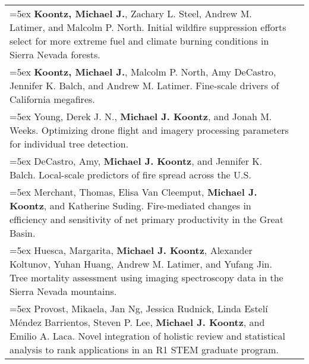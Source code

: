 \begin{longtable}{@{} >{\raggedright}p{5.25in} >{\raggedleft}X @{}}

\hangindent=5ex \textbf{Koontz, Michael J.}, Zachary L. Steel, Andrew M. Latimer, and Malcolm P. North. Initial wildfire suppression efforts select for more extreme fuel and climate burning conditions in Sierra Nevada forests.  & [\textcolor{blue}{\href{https://github.com/mikoontz/selection-by-suppression}{GitHub}}] \tabularnewline

\hangindent=5ex \textbf{Koontz, Michael J.}, Malcolm P. North, Amy DeCastro, Jennifer K. Balch, and Andrew M. Latimer. Fine-scale drivers of California megafires.  & [\textcolor{blue}{\href{https://github.com/mikoontz/megafire-fine-scale-drivers}{GitHub}}] \tabularnewline

\hangindent=5ex Young, Derek J. N., \textbf{Michael J. Koontz}, and Jonah M. Weeks. Optimizing drone flight and imagery processing parameters for individual tree detection. & \tabularnewline

\hangindent=5ex DeCastro, Amy, \textbf{Michael J. Koontz}, and Jennifer K. Balch. Local-scale predictors of fire spread across the U.S. & \tabularnewline

\hangindent=5ex Merchant, Thomas, Elisa Van Cleemput, \textbf{Michael J. Koontz}, and Katherine Suding. Fire-mediated changes in efficiency and sensitivity of net primary productivity in the Great Basin. & \tabularnewline

\hangindent=5ex Huesca, Margarita, \textbf{Michael J. Koontz}, Alexander Koltunov, Yuhan Huang, Andrew M. Latimer, and Yufang Jin. Tree mortality assessment using imaging spectroscopy data in the Sierra Nevada mountains. & \tabularnewline

\hangindent=5ex Provost, Mikaela, Jan Ng, Jessica Rudnick, Linda Estel\'i M\'endez Barrientos, Steven P. Lee, \textbf{Michael J. Koontz}, and Emilio A. Laca. Novel integration of holistic review and statistical analysis to rank applications in an R1 STEM graduate program. & \tabularnewline

\end{longtable}




